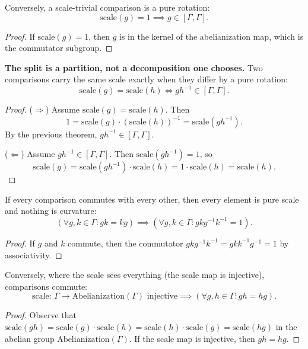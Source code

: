 \begin{theorem}
Conversely, a scale-trivial comparison is a pure rotation:
\[
\text{scale}(g) = 1 \implies g \in [\Gamma, \Gamma].
\]
\begin{proof}
If $\text{scale}(g) = 1$, then $g$ is in the kernel of the abelianization map, which is the commutator subgroup.
\end{proof}
\end{theorem}

\begin{theorem}
\textbf{The split is a partition, not a decomposition one chooses.} Two comparisons carry the same scale exactly when they differ by a pure rotation:
\[
\text{scale}(g) = \text{scale}(h) \iff g h^{-1} \in [\Gamma, \Gamma].
\]
\begin{proof}
($\Rightarrow$) Assume $\text{scale}(g) = \text{scale}(h)$. Then
\[
1 = \text{scale}(g) \cdot (\text{scale}(h))^{-1} = \text{scale}(g h^{-1}).
\]
By the previous theorem, $g h^{-1} \in [\Gamma, \Gamma]$.

($\Leftarrow$) Assume $g h^{-1} \in [\Gamma, \Gamma]$. Then $\text{scale}(g h^{-1}) = 1$, so
\[
\text{scale}(g) = \text{scale}(g h^{-1}) \cdot \text{scale}(h) = 1 \cdot \text{scale}(h) = \text{scale}(h).
\]
\end{proof}
\end{theorem}

\begin{theorem}
If every comparison commutes with every other, then every element is pure scale and nothing is curvature:
\[
(\forall g, k \in \Gamma : g k = k g) \implies (\forall g, k \in \Gamma : g k g^{-1} k^{-1} = 1).
\]
\begin{proof}
If $g$ and $k$ commute, then the commutator $g k g^{-1} k^{-1} = g k k^{-1} g^{-1} = 1$ by associativity.
\end{proof}
\end{theorem}

\begin{theorem}
Conversely, where the scale sees everything (the scale map is injective), comparisons commute:
\[
\text{scale: } \Gamma \to \text{Abelianization}(\Gamma) \text{ injective} \implies (\forall g, h \in \Gamma : g h = h g).
\]
\begin{proof}
Observe that $\text{scale}(g h) = \text{scale}(g) \cdot \text{scale}(h) = \text{scale}(h) \cdot \text{scale}(g) = \text{scale}(h g)$ in the abelian group $\text{Abelianization}(\Gamma)$. If the scale map is injective, then $g h = h g$.
\end{proof}
\end{theorem}

